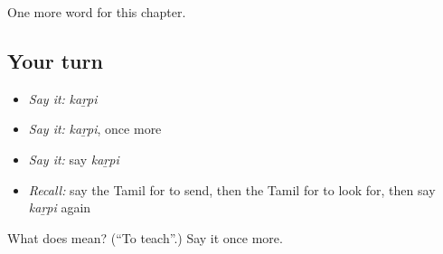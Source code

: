 \begin{grammarlens}[title={What you've built}]
One more word for this chapter.
\end{grammarlens}

\subsection*{Your turn}
\begin{itemize}
\raggedright
  \item \emph{Say it:} \emph{kaṟpi}
  \item \emph{Say it:} \emph{kaṟpi}, once more
  \item \emph{Say it:} say \emph{kaṟpi}
  \item \emph{Recall:} say the Tamil for to send, then the Tamil for to look for, then say \emph{kaṟpi} again
\end{itemize}

\begin{tcolorbox}[breakable,colback=teal!4,colframe=teal!35!black,title={Before you move on}]
What does  mean? (\textquotedblleft{}To teach\textquotedblright{}.) Say it once more.
\end{tcolorbox}
